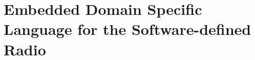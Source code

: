 
\renewcommand{\curChapter}{main/chapter5}

\chapter{Embedded Domain Specific Language for the Software-defined Radio}
\label{chap:sdr}